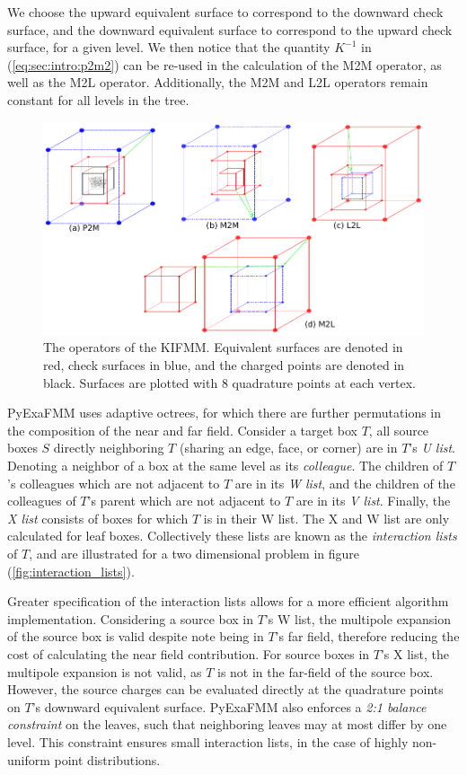 \documentclass{IEEEcsmag}
\begin{document}
We choose the upward equivalent surface to correspond to the downward check surface, and the downward equivalent surface to correspond to the upward check surface, for a given level. We then notice that the quantity $K^{-1}$ in (\ref{eq:sec:intro:p2m2}) can be re-used in the calculation of the M2M operator, as well as the M2L operator. Additionally, the M2M and L2L operators remain constant for all levels in the tree.

\begin{figure}
	\centerline{\includegraphics {figures/operators.pdf}}
	\caption{The operators of the KIFMM. Equivalent surfaces are denoted in red, check surfaces in blue, and the charged points are denoted in black. Surfaces are plotted with 8 quadrature points at each vertex.}
	\label{fig:operators}
\end{figure}

PyExaFMM uses adaptive octrees, for which there are further permutations in the composition of the near and far field. Consider a target box $T$, all source boxes $S$ directly neighboring $T$ (sharing an edge, face, or corner) are in $T$'s \textit{U list}. Denoting a neighbor of a box at the same level as its \textit{colleague}. The children of $T$'s colleagues which are not adjacent to $T$ are in its \textit{W list}, and the children of the colleagues of $T$'s parent which are not adjacent to $T$ are in its \textit{V list}. Finally, the \textit{X list} consists of boxes for which $T$ is in their W list. The X and W list are only calculated for leaf boxes. Collectively these lists are known as the \textit{interaction lists} of $T$, and are illustrated for a two dimensional problem in figure (\ref{fig:interaction_lists}).

Greater specification of the interaction lists allows for a more efficient algorithm implementation. Considering a source box in $T$'s W list, the multipole expansion of the source box is valid despite note being in $T$'s far field, therefore reducing the cost of calculating the near field contribution. For source boxes in $T$'s X list, the multipole expansion is not valid, as $T$ is not in the far-field of the source box. However, the source charges can be evaluated directly at the quadrature points on $T$'s downward equivalent surface. PyExaFMM also enforces a \textit{2:1 balance constraint} on the leaves, such that neighboring leaves may at most differ by one level. This constraint ensures small interaction lists, in the case of highly non-uniform point distributions.
\end{document}
